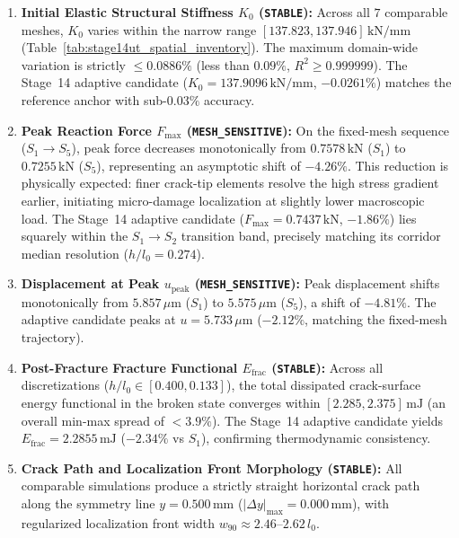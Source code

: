\begin{enumerate}
    \item \textbf{Initial Elastic Structural Stiffness $K_0$ (\texttt{STABLE}):} Across all $7$ comparable meshes, $K_0$ varies within the narrow range $[137.823, 137.946]\,\mathrm{kN/mm}$ (Table~\ref{tab:stage14ut_spatial_inventory}). The maximum domain-wide variation is strictly $\le 0.0886\%$ (less than $0.09\%$, $R^2 \ge 0.999999$). The Stage~14 adaptive candidate ($K_0 = 137.9096\,\mathrm{kN/mm}$, $-0.0261\%$) matches the reference anchor with sub-$0.03\%$ accuracy.
    \item \textbf{Peak Reaction Force $F_{\max}$ (\texttt{MESH\_SENSITIVE}):} On the fixed-mesh sequence ($S_1 \to S_5$), peak force decreases monotonically from $0.7578\,\mathrm{kN}$ ($S_1$) to $0.7255\,\mathrm{kN}$ ($S_5$), representing an asymptotic shift of $-4.26\%$. This reduction is physically expected: finer crack-tip elements resolve the high stress gradient earlier, initiating micro-damage localization at slightly lower macroscopic load. The Stage~14 adaptive candidate ($F_{\max} = 0.7437\,\mathrm{kN}$, $-1.86\%$) lies squarely within the $S_1 \to S_2$ transition band, precisely matching its corridor median resolution ($h/l_0 = 0.274$).
    \item \textbf{Displacement at Peak $u_{\mathrm{peak}}$ (\texttt{MESH\_SENSITIVE}):} Peak displacement shifts monotonically from $5.857\,\mu\mathrm{m}$ ($S_1$) to $5.575\,\mu\mathrm{m}$ ($S_5$), a shift of $-4.81\%$. The adaptive candidate peaks at $u = 5.733\,\mu\mathrm{m}$ ($-2.12\%$, matching the fixed-mesh trajectory).
    \item \textbf{Post-Fracture Fracture Functional $E_{\mathrm{frac}}$ (\texttt{STABLE}):} Across all discretizations ($h/l_0 \in [0.400, 0.133]$), the total dissipated crack-surface energy functional in the broken state converges within $[2.285, 2.375]\,\mathrm{mJ}$ (an overall min-max spread of $< 3.9\%$). The Stage~14 adaptive candidate yields $E_{\mathrm{frac}} = 2.2855\,\mathrm{mJ}$ ($-2.34\%$ vs $S_1$), confirming thermodynamic consistency.
    \item \textbf{Crack Path and Localization Front Morphology (\texttt{STABLE}):} All comparable simulations produce a strictly straight horizontal crack path along the symmetry line $y = 0.500\,\mathrm{mm}$ ($|\Delta y|_{\max} = 0.000\,\mathrm{mm}$), with regularized localization front width $w_{90} \approx 2.46\text{--}2.62\,l_0$.
\end{enumerate}

